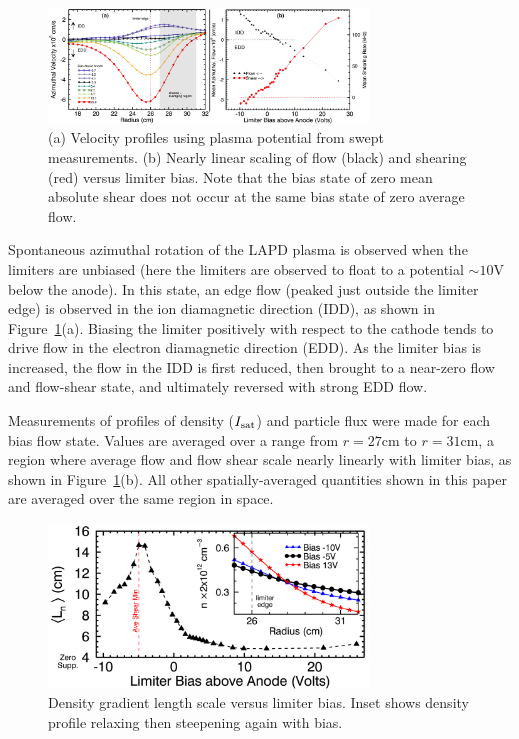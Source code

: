 \documentclass[aps,prl,amsmath,amssymb,preprint,superscriptaddress]{revtex4}
\begin{document}
\begin{figure}[!htbp]
\centerline{
\includegraphics[width=8.5cm]{velocity_flowshear.pdf}}
\caption{\label{fig:velocity_flowshear} (a) Velocity profiles using plasma potential from swept measurements. (b) Nearly linear scaling of flow (black) and shearing (red) versus limiter bias. Note that the bias state of zero mean absolute shear does not occur at the same bias state of zero average flow.}
\end{figure}

Spontaneous azimuthal rotation of the LAPD plasma is observed when the limiters are
unbiased (here the limiters are observed to float to a
potential $\sim 10$V below the anode).  In this state, an edge flow
(peaked just outside the limiter edge) is
observed in the ion diamagnetic direction (IDD), as shown in
Figure~\ref{fig:velocity_flowshear}(a).  Biasing the limiter positively
with respect to the cathode tends to drive flow in the electron
diamagnetic direction (EDD).  As the limiter bias is increased, the
flow in the IDD is first reduced, then brought to a near-zero flow
and flow-shear state, and ultimately reversed with strong EDD flow.

Measurements of profiles of density ($I_{\rm sat}$) and particle flux
were made for each bias flow state. Values are averaged over a range
from $r=27$cm to $r=31$cm, a region where average flow and flow shear scale
nearly linearly with limiter bias, as shown in
Figure~\ref{fig:velocity_flowshear}(b).  All other spatially-averaged
quantities shown in this paper are averaged over the same region in space.

\begin{figure}[!htbp]
\centerline{
\includegraphics[width=8.5cm]{densgrad.pdf}}
\caption{\label{fig:densgrad} Density gradient length scale versus limiter bias. Inset shows density profile relaxing then steepening again with bias.}
\end{figure}
\end{document}
